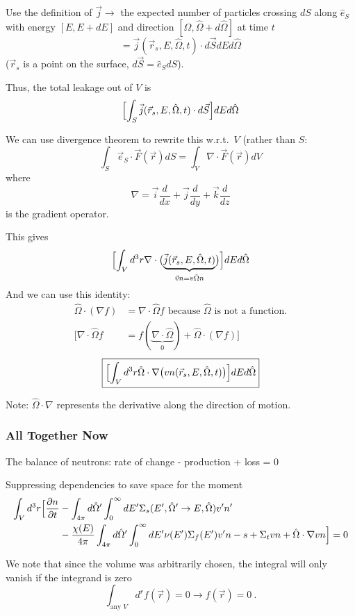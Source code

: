 \documentclass[12pt]{article}
\newlength{\up}
\newcommand{\vOmega}{\ensuremath{\hat{\Omega}}}
\begin{document}
Use the definition of $\vec{j} \rightarrow$ the expected number of particles crossing $dS$ along $\hat{e}_S$ with energy $[E, E + dE]$ and direction $[\vOmega, \vOmega + d\vOmega]$ at time $t$  
\[= \vec{j}(\vec{r}_s, E, \vOmega, t) \cdot d\vec{S} dE d\vOmega\]
($\vec{r}_s$ is a point on the surface, $d\vec{S} = \hat{e}_S dS$).

Thus, the total leakage out of $V$ is
\[\Bigl[\int_S \vec{j}(\vec{r}_s, E, \vOmega, t) \cdot d\vec{S} \Bigr] dE d\vOmega \]

We can use divergence theorem to rewrite this w.r.t.\ $V$ (rather than $S$:
\[\int_S \vec{e}_S \cdot \vec{F} (\vec{r}) dS = \int_V \nabla \cdot \vec{F} (\vec{r}) dV\]
where
\[\nabla = \vec{i}\frac{d}{dx} + \vec{j}\frac{d}{dy} + \vec{k}\frac{d}{dz}\]
is the gradient operator.

This gives
\[\Bigl[\int_V d^3r \nabla \cdot \bigl( \underbrace{\vec{j}(\vec{r}_s, E, \vOmega, t)}_{\vec{v}n = v \vOmega n} \bigr) \Bigr] dE d\vOmega \]
%
And we can use this identity:
\begin{align}
%
\vOmega \cdot (\nabla f) &= \nabla \cdot \vOmega f \text{ because }\vOmega\text{ is not a function.} \\
\bigl[\nabla \cdot \vOmega f &= f(\underbrace{\nabla \cdot \vOmega}_{0}) + \vOmega \cdot (\nabla f)\bigr]
\end{align}
%
\[ \boxed{\Bigl[\int_V d^3r \vOmega \cdot \nabla \bigl(v n(\vec{r}_s, E, \vOmega, t) \bigr) \Bigr] dE d\vOmega }\]

Note: $\vOmega \cdot \nabla$ represents the derivative along the direction of motion.

\subsubsection{All Together Now}
The balance of neutrons: rate of change - production + loss = 0

Suppressing dependencies to save space for the moment
%
\begin{align}
\int_V d^3r \Bigl[\frac{\partial n}{\partial t} &- 
\int_{4\pi} d\vOmega' \int_0^{\infty} dE' \Sigma_s(E', \vOmega' \rightarrow E, \vOmega) v' n' \nonumber\\&-
\frac{\chi(E)}{4\pi} \int_{4\pi} d\vOmega' \int_0^{\infty} dE' \nu(E') \Sigma_f(E') v' n -
s +
\Sigma_t v n + 
\vOmega \cdot \nabla v n \Bigr] = 0
\end{align}

We note that since the volume was arbitrarily chosen, the integral will only vanish if the integrand is zero 
\[\int_{\text{any }V} d^r f(\vec{r}) = 0 \rightarrow f(\vec{r}) = 0 \:.\]
\end{document}
